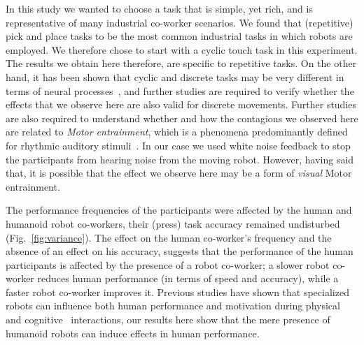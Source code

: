 In this study we wanted to choose a task that is simple, yet rich, and is representative of many industrial co-worker scenarios. We found that (repetitive) pick and place tasks to be the most common industrial tasks in which robots are employed. We therefore chose to start with a cyclic touch task in this experiment. The results we obtain here therefore, are specific to repetitive tasks. On the other hand, it has been shown that cyclic and discrete tasks may be very different in terms of neural processes~\cite{Schaal:Nature:2004}, and further studies are required to verify whether the effects that we observe here are also valid for discrete movements. Further studies are also required to understand whether and how the contagions we observed here are related to \textit{Motor entrainment}, which is a phenomena predominantly defined for rhythmic auditory stimuli~\cite{Tierney:Frontiers:2014,Schachner:Elsevier:2009}. In our case we used white noise feedback to stop the participants from hearing noise from the moving robot. However, having said that, it is possible that the effect we observe here may be a form of \textit{visual} Motor entrainment. 

The performance frequencies of the participants were affected by the human and humanoid robot co-workers, their (press) task accuracy remained undisturbed (Fig.~\ref{fig:variance}). The effect on the human co-worker's frequency and the absence of an effect on his accuracy, suggests that the performance of the human participants is affected by the presence of a robot co-worker; a slower robot co-worker reduces human performance (in terms of speed and accuracy), while a faster robot co-worker improves it. Previous studies have shown that specialized robots can influence both human performance and motivation during physical~\cite{Takagi:Nature:2017} and cognitive~\cite{Fasola:ICDL:2010} interactions, our results here show that the mere presence of humanoid robots can induce effects in human performance. 

